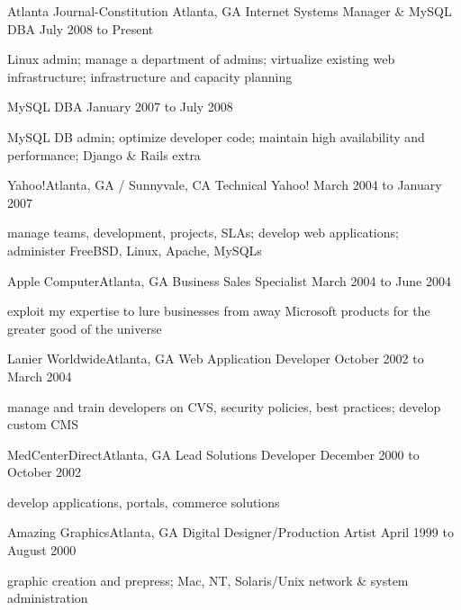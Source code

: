 \documentclass[10pt]{article}
\begin{document}


\sectionheader
{Atlanta Journal-Constitution}
{Atlanta, GA}
{Internet Systems Manager \& MySQL DBA}
{July 2008 to Present}
\begin{longtext}
Linux admin;
manage a department of admins;
virtualize existing web infrastructure;
infrastructure and capacity planning
\end{longtext}
\sectionsub
{MySQL DBA}
{January 2007 to July 2008}
\begin{longtext}
MySQL DB admin;
optimize developer code;
maintain high availability and performance;
Django \& Rails extra
\end{longtext}

\sectionheader
{Yahoo!}{Atlanta, GA / Sunnyvale, CA}
{Technical Yahoo!}
{March 2004 to January 2007}
\begin{longtext}
manage teams, development, projects, SLAs;
develop web applications;
administer FreeBSD, Linux, Apache, MySQLs
\end{longtext}

\sectionheader
{Apple Computer}{Atlanta, GA}
{Business Sales Specialist}
{March 2004 to June 2004}
\begin{longtext}
exploit my expertise to lure businesses from away Microsoft products for the greater good of the universe
\end{longtext}

\sectionheader
{Lanier Worldwide}{Atlanta, GA}
{Web Application Developer}
{October 2002 to March 2004}
\begin{longtext}
manage and train developers on CVS, security policies, best practices;
develop custom CMS
\end{longtext}

\sectionheader
{MedCenterDirect}{Atlanta, GA}
{Lead Solutions Developer}
{December 2000 to October 2002}
\begin{longtext}
develop applications, portals, commerce solutions
\end{longtext}

\sectionheader
{Amazing Graphics}{Atlanta, GA}
{Digital Designer/Production Artist}
{April 1999 to August 2000}
\begin{longtext}
graphic creation and prepress;
Mac, NT, Solaris/Unix network \& system administration
\end{longtext}
\end{document}
